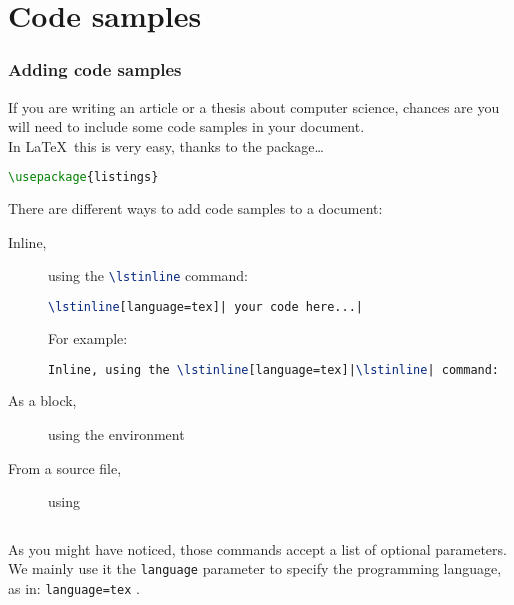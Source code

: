 
\part{Code samples}

\section{Adding code samples} \label{showing-code}

If you are writing an article or a thesis about computer science, chances are you will need to include some code samples in your document. \\

In \LaTeX\ this is very easy, thanks to the  package\ldots

\begin{lstlisting}[language=tex]
\usepackage{listings}
\end{lstlisting}


\bigskip

There are different ways to add code samples to a document: 
\begin{description}
	\item[Inline,] using the \lstinline[language=tex]|\lstinline| command: 
	\begin{lstlisting}[language=tex]
\lstinline[language=tex]| your code here...|
\end{lstlisting}
For example:
\begin{lstlisting}[language=tex]
Inline, using the \lstinline[language=tex]|\lstinline| command:
	\end{lstlisting}

	\item[As a block,] using the  environment	
		
	
	\item[From a source file,] using \lstinline||  \label{lstinputlisting}
	\begin{lstlisting}[language=tex]

	\end{lstlisting}
\end{description}

As you might have noticed, those commands accept a list of optional parameters.
We mainly use it the \lstinline|language| parameter to specify the programming language, as in: \lstinline|language=tex| . \\

